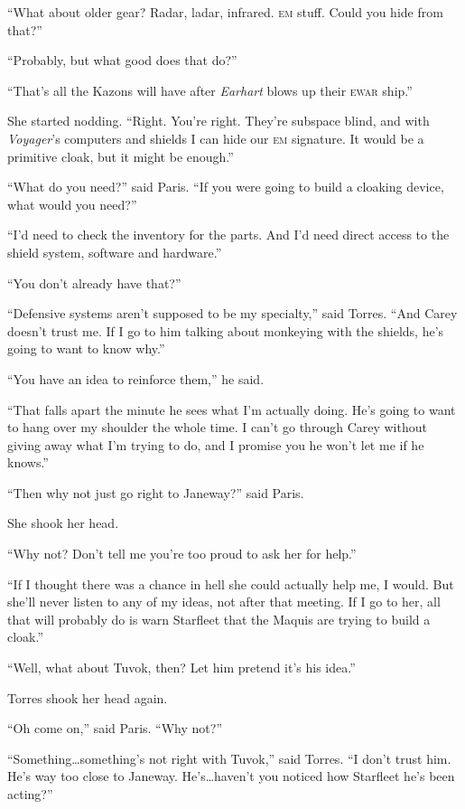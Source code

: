 \documentclass[twoside,letterpaper,12pt]{memoir}
\begin{document}
``What about older gear? Radar, ladar, infrared. \textsc{em} stuff. Could you hide from that?'' 

``Probably, but what good does that do?'' 

``That’s all the Kazons will have after \textit{Earhart} blows up their \textsc{ewar} ship.'' 

She started nodding. ``Right. You’re right. They’re subspace blind, and with \textit{Voyager}’s computers and shields I can hide our \textsc{em} signature. It would be a primitive cloak, but it might be enough.'' 

``What do you need?'' said Paris. ``If you were going to build a cloaking device, what would you need?'' 

``I'd need to check the inventory for the parts. And I'd need direct access to the shield system, software and hardware.'' 

``You don't already have that?'' 

``Defensive systems aren't supposed to be my specialty,'' said Torres. ``And Carey doesn't trust me. If I go to him talking about monkeying with the shields, he's going to want to know why.'' 

``You have an idea to reinforce them,'' he said. 

``That falls apart the minute he sees what I'm actually doing. He's going to want to hang over my shoulder the whole time. I can't go through Carey without giving away what I'm trying to do, and I promise you he won't let me if he knows.'' 

``Then why not just go right to Janeway?'' said Paris. 

She shook her head. 

``Why not? Don't tell me you're too proud to ask her for help.'' 

``If I thought there was a chance in hell she could actually help me, I would. But she’ll never listen to any of my ideas, not after that meeting. If I go to her, all that will probably do is warn Starfleet that the Maquis are trying to build a cloak.'' 

``Well, what about Tuvok, then? Let him pretend it's his idea.'' 

Torres shook her head again. 

``Oh come on,'' said Paris. ``Why not?'' 

``Something\ldots something's not right with Tuvok,'' said Torres. ``I don't trust him. He's way too close to Janeway. He's\ldots haven't you noticed how Starfleet he's been acting?'' 
\end{document}
